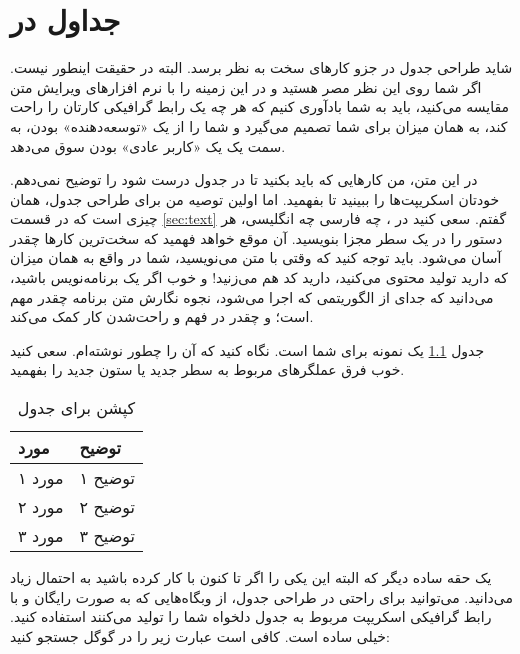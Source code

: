 \chapter{
جداول در
}
\label{chap:chap3}

شاید طراحی جدول در
جزو کارهای سخت به نظر برسد. البته در حقیقت اینطور نیست. اگر شما روی این نظر مصر هستید و در این زمینه
را با نرم افزارهای ویرایش متن
مقایسه می‌کنید، باید به شما بادآوری کنیم که هر چه یک رابط گرافیکی کارتان را راحت کند، به همان میزان برای شما تصمیم می‌گیرد و شما را از یک «توسعه‌دهنده» بودن، به سمت یک یک «کاربر عادی» بودن سوق می‌دهد.

در این متن، من کارهایی که باید بکنید تا در
جدول درست شود را توضیح نمی‌دهم. خودتان اسکریپت‌ها را ببینید تا بفهمید. اما اولین توصیه من برای طراحی جدول، همان چیزی است که در قسمت
\ref{sec:text} 
گفتم. سعی کنید در
، چه فارسی چه انگلیسی، هر دستور را در یک سطر مجزا بنویسید. آن موقع خواهد فهمید که سخت‌ترین کارها چقدر آسان می‌شود. باید توجه کنید که وقتی با
متن می‌نویسید، شما در واقع به همان میزان که دارید تولید محتوی می‌کنید، دارید کد هم می‌زنید! و خوب اگر یک برنامه‌نویس باشید، می‌دانید که جدای از الگوریتمی که اجرا می‌شود، نجوه نگارش متن برنامه چقدر مهم است؛ و چقدر در فهم و راحت‌شدن کار کمک می‌کند. 

جدول
\ref{tab:inventory}
یک نمونه برای شما است. نگاه کنید که آن را چطور نوشته‌ام. سعی کنید خوب فرق عملگرهای مربوط به سطر جدید یا ستون جدید را بفهمید.


\begin{table}[H] 
\caption{کپشن برای جدول}
\label{tab:inventory}
\begin{tabularx}{\textwidth}{| X | X |}
    \hline
     مورد
      & 
      توضیح
        \\ \hline
      
     مورد ۱
     & 
     توضیح ۱ 
     \\ \hline
     
     مورد ۲ 
     & 
     توضیح ۲ 
     \\ \hline
     
     مورد ۳ 
     & 
     توضیح ۳
     \\ \hline
     
\end{tabularx}
\end{table}


یک حقه ساده دیگر که البته این یکی را اگر تا کنون با
کار کرده باشید به احتمال زیاد می‌دانید. می‌توانید برای راحتی در طراحی جدول، از وبگاه‌هایی که به صورت رایگان و با رابط گرافیکی اسکریپت
مربوط به جدول دلخواه شما را تولید می‌کنند استفاده کنید. خیلی ساده است. کافی است عبارت زیر را در گوگل جستجو کنید:

